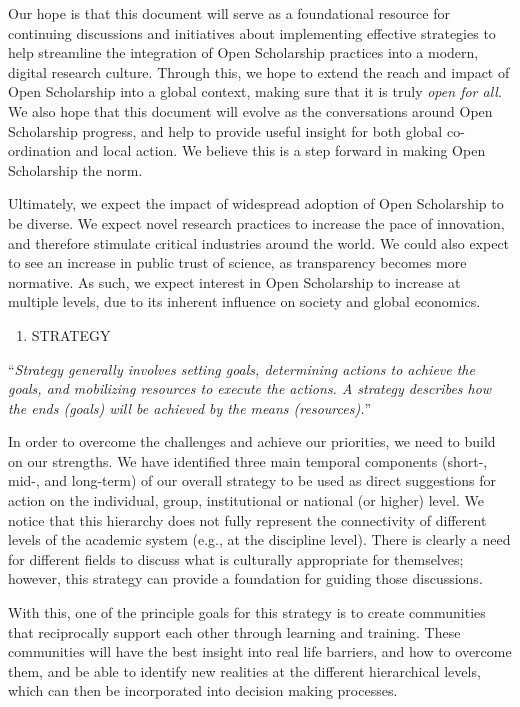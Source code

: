 \documentclass[]{article}
\providecommand{\tightlist}{%
  \setlength{\itemsep}{0pt}\setlength{\parskip}{0pt}}
\begin{document}
Our hope is that this document will serve as a foundational resource for
continuing discussions and initiatives about implementing effective
strategies to help streamline the integration of Open Scholarship
practices into a modern, digital research culture. Through this, we hope
to extend the reach and impact of Open Scholarship into a global
context, making sure that it is truly \emph{open for all}. We also hope
that this document will evolve as the conversations around Open
Scholarship progress, and help to provide useful insight for both global
co-ordination and local action. We believe this is a step forward in
making Open Scholarship the norm.

Ultimately, we expect the impact of widespread adoption of Open
Scholarship to be diverse. We expect novel research practices to
increase the pace of innovation, and therefore stimulate critical
industries around the world. We could also expect to see an increase in
public trust of science, as transparency becomes more normative. As
such, we expect interest in Open Scholarship to increase at multiple
levels, due to its inherent influence on society and global economics.

\begin{enumerate}
\def\labelenumi{\arabic{enumi}.}
\setcounter{enumi}{1}
\tightlist
\item
  STRATEGY
\end{enumerate}

``\emph{Strategy generally involves setting goals, determining actions
to achieve the goals, and mobilizing resources to execute the actions. A
strategy describes how the ends (goals) will be achieved by the means
(resources).}''

In order to overcome the challenges and achieve our priorities, we need
to build on our strengths. We have identified three main temporal
components (short-, mid-, and long-term) of our overall strategy to be
used as direct suggestions for action on the individual, group,
institutional or national (or higher) level. We notice that this
hierarchy does not fully represent the connectivity of different levels
of the academic system (e.g., at the discipline level). There is clearly
a need for different fields to discuss what is culturally appropriate
for themselves; however, this strategy can provide a foundation for
guiding those discussions.

With this, one of the principle goals for this strategy is to create
communities that reciprocally support each other through learning and
training. These communities will have the best insight into real life
barriers, and how to overcome them, and be able to identify new
realities at the different hierarchical levels, which can then be
incorporated into decision making processes.
\end{document}
